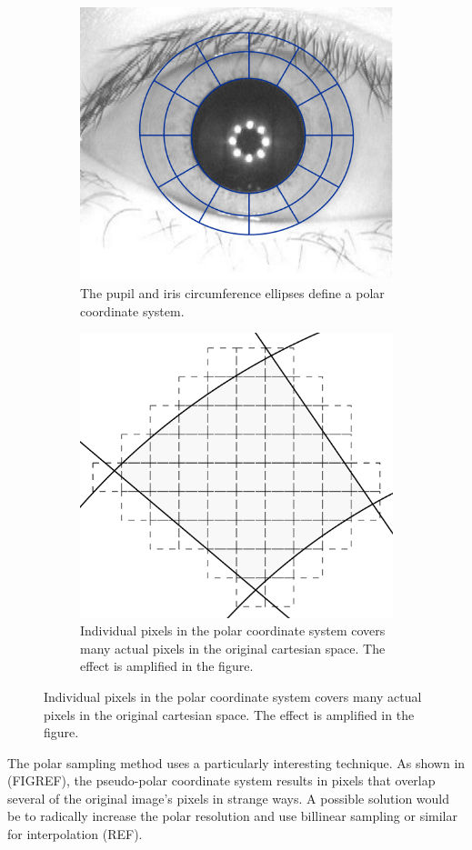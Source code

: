 \begin{figure}
    \begin{subfigure}{0.5\linewidth}
        \centering
        \includegraphics[width=0.6\linewidth]{figures/polar-image.pdf}
        \caption{The pupil and iris circumference ellipses define a polar coordinate system.}
        \label{fig:polar-method}
    \end{subfigure}
    \begin{subfigure}{0.5\linewidth}
        \centering
        \includegraphics[width=0.6\linewidth]{figures/polar-method.pdf}
        \caption{Individual pixels in the polar coordinate system covers many actual pixels in the original cartesian space. The effect is amplified in the figure.}
        \label{fig:polar-method}
    \end{subfigure}
\end{figure}

The polar sampling method uses a particularly interesting technique. As shown in (FIGREF), the pseudo-polar coordinate system results in pixels that overlap several of the original image's pixels in strange ways. A possible solution would be to radically increase the polar resolution and use billinear sampling or similar for interpolation (REF). 

